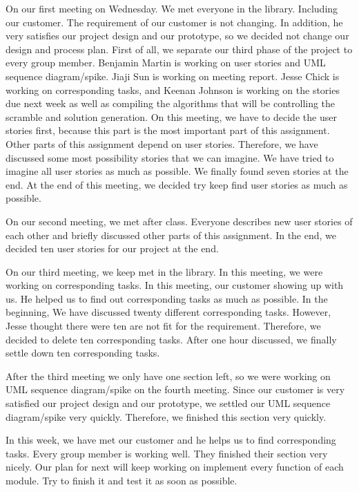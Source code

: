 \documentclass[12pt]{article}
\begin{document}
\par
On our first meeting on Wednesday. We met everyone in the library. Including our customer. The requirement of our customer is not changing. In addition, he very satisfies our project design and our prototype, so we decided not change our design and process plan. First of all, we separate our third phase of the project to every group member. Benjamin Martin is working on user stories and UML sequence diagram/spike. Jiaji Sun is working on meeting report. Jesse Chick is working on corresponding tasks, and Keenan Johnson is working on the stories due next week as well as compiling the algorithms that will be controlling the scramble and solution generation. On this meeting, we have to decide the user stories first, because this part is the most important part of this assignment. Other parts of this assignment depend on user stories. Therefore, we have discussed some most possibility stories that we can imagine. We have tried to imagine all user stories as much as possible. We finally found seven stories at the end. At the end of this meeting, we decided try keep find user stories as much as possible. \\

\par
 On our second meeting, we met after class. Everyone describes new user stories of each other and briefly discussed other parts of this assignment. In the end, we decided ten user stories for our project at the end. \\
 
 \par
 On our third meeting, we keep met in the library. In this meeting, we were working on corresponding tasks. In this meeting, our customer showing up with us. He helped us to find out corresponding tasks as much as possible. In the beginning, We have discussed twenty different corresponding tasks. However, Jesse thought there were ten are not fit for the requirement. Therefore, we decided to delete ten corresponding tasks.  After one hour discussed, we finally settle down ten corresponding tasks. \\
 
 \par
 After the third meeting we only have one section left, so we were working on UML sequence diagram/spike on the fourth meeting. Since our customer is very satisfied our project design and our prototype, we settled our UML sequence diagram/spike very quickly. Therefore, we finished this section very quickly. \\
 
 \par
 In this week, we have met our customer and he helps us to find corresponding tasks. Every group member is working well. They finished their section very nicely. Our plan for next will keep working on implement every function of each module. Try to finish it and test it as soon as possible. \\
\end{document}
